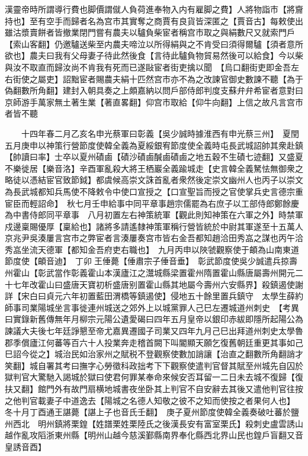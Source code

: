 漢靈帝時所謂導行費也脚價謂僦人負荷進奉物入内有雇脚之費】人將物詣市【將齎持也】至有空手而歸者名為宫市其實奪之商賈有良貨皆深匿之【賈音古】每敕使出雖沽漿賣餅者皆撤業閉門嘗有農夫以驢負柴宦者稱宫市取之與絹數尺又就索門戶【索山客翻】仍邀驢送柴至内農夫啼泣以所得絹與之不肯受曰須得爾驢【須者意所欲也】農夫曰我有父母妻子待此然後食【言待此驢負物貿易然後可以給食】今以柴與汝不取直而歸汝尚不肯我有死而已遂敺宦者街吏擒以聞　【烏口翻街吏即金吾左右街使之屬吏】詔黜宦者賜農夫絹十匹然宫市亦不為之改諫官御史數諫不聽【為于偽翻數所角翻】建封入朝具奏之上頗嘉納以問戶部侍郎判度支蘇弁弁希宦者意對曰京師游手萬家無土著生業【著直畧翻】仰宫市取給【仰牛向翻】上信之故凡言宫市者皆不聽

　　十四年春二月乙亥名申光蔡軍曰彰義【吳少誠時據淮西有申光蔡三州】　夏閏五月庚申以神策行營節度使韓全義為夏綏銀宥節度使全義時屯長武城詔帥其衆赴鎮【帥讀曰率】士卒以夏州磧鹵【磧沙磧鹵醎鹵磧鹵之地五穀不生磧七迹翻】又盛夏不樂徙居【樂音洛】辛酉軍亂殺大將王栖巖全義踰城走【史言韓全義駑怯無御衆之略徒以憑結宦官致節鉞】都虞候高崇文誅首亂者衆然後定崇文幽州人也丙子以崇文為長武城都知兵馬使不降敕令中使口宣授之【口宣聖旨而授之官使掌兵史言德宗重宦臣而輕詔命】　秋七月壬申給事中同平章事趙宗儒罷為右庶子以工部侍郎鄭餘慶為中書侍郎同平章事　八月初置左右神策統軍【觀此則知神策在六軍之外】時禁軍戍邊稟賜優厚【稟給也】諸將多請遙隸神策軍稱行營皆統於中尉其軍遂至十五萬人　京兆尹吳湊屢言宫市之弊宦者言湊屢奏宫市皆右金吾都知趙洽田秀嵓之謀也丙午洽秀嵓坐流天德軍【都知金吾府吏右職也】　九月丙申以陜虢觀察使于頔為山南東道節度使【頔音迪】　丁卯王倕薨【倕肅宗子倕音垂】　彰武節度使吳少誠遣兵掠壽州霍山【彰武當作彰義霍山本漢廬江之灊城縣梁置霍州隋置霍山縣唐屬壽州開元二十七年改霍山曰盛唐天寶初析盛唐别置霍山縣其地屬今壽州六安縣界】殺鎮遏使謝詳【宋白曰貞元六年初置藍田渭橋等鎮遏使】侵地五十餘里置兵鎮守　太學生薛約師事司業陽城坐言事徙連州城送之郊外上以城黨罪人己巳左遷城道州刺史　【考異曰實錄新舊傳無年月柳宗元陽公遺愛碣曰四年五月皇帝以銀印赤紱即隱所起陽公為諫議大夫後七年廷諍懇至帝尤嘉異遷國子司業又四年九月己巳出拜道州刺史太學魯郡季償廬江何蕃等百六十人投業奔走稽首闕下叫閽顯天願乞復舊朝廷重更其事如己巳詔今從之】城治民如治家州之賦税不登觀察使數加誚讓【治直之翻數所角翻誚才笑翻】城自署其考曰撫字心勞徵科政拙考下下觀察使遣判官督其賦至州城先自囚於獄判官大驚馳入謁城於獄曰使君何罪某奉命來候安否耳留一二日未去城不復歸【復扶又翻】館門外有故門扇横地城書夜坐卧其上判官不自安辭去其後又遣他判官往按之他判官載妻子中道逸去【陽城之名德人知敬之彼不之知而使按之者果何人也】　冬十月丁酉通王諶薨【諶上子也音氏壬翻】　庚子夏州節度使韓全義奏破吐蕃於鹽州西北　明州鎮將栗鍠【姓譜栗姓栗陸氏之後漢長安有富室栗氏】殺刺史盧雲誘山越作亂攻䧟浙東州縣【明州山越今慈溪鄞縣南界奉化縣西北界山民也鍠戶盲翻又音皇誘音酉】

